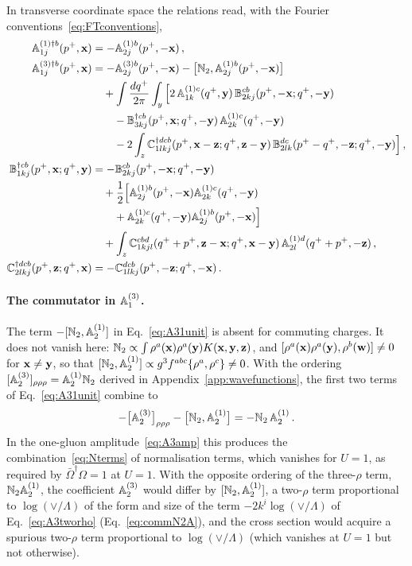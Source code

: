 In transverse coordinate space the relations read, with the Fourier conventions~\eqref{eq:FTconventions},
\begin{align}
\mathbb{A}^{(1)\dagger b}_{1j}(p^+,\mathbf{x})&=-\mathbb{A}^{(1)b}_{2j}(p^+,-\mathbf{x})\,,\notag\\
\mathbb{A}^{(3)\dagger b}_{1j}(p^+,\mathbf{x})&=-\mathbb{A}^{(3)b}_{2j}(p^+,-\mathbf{x})-\big[\mathbb{N}_2,\mathbb{A}^{(1)b}_{2j}(p^+,-\mathbf{x})\big]
\notag\\&\quad+\int\frac{dq^+}{2\pi}\int_y\Big[2\,\mathbb{A}^{(1)c}_{1k}(q^+,\mathbf{y})\,\mathbb{B}^{cb}_{2kj}(p^+,-\mathbf{x};q^+,-\mathbf{y})
\notag\\&\qquad
-\mathbb{B}^{\dagger cb}_{3kj}(p^+,\mathbf{x};q^+,-\mathbf{y})\,\mathbb{A}^{(1)c}_{2k}(q^+,-\mathbf{y})
\notag\\&\qquad-2\int_z\mathbb{C}^{\dagger dcb}_{1lkj}(p^+,\mathbf{x}-\mathbf{z};q^+,\mathbf{z}-\mathbf{y})\,\mathbb{B}^{dc}_{2lk}(p^+-q^+,-\mathbf{z};q^+,-\mathbf{y})\Big]\,,\notag\\
\mathbb{B}^{\dagger cb}_{1kj}(p^+,\mathbf{x};q^+,\mathbf{y})&=-\mathbb{B}^{cb}_{2kj}(p^+,-\mathbf{x};q^+,-\mathbf{y})\notag\\&\quad+\frac12\Big[\mathbb{A}^{(1)b}_{2j}(p^+,-\mathbf{x})\mathbb{A}^{(1)c}_{2k}(q^+,-\mathbf{y})\notag\\&\qquad+\mathbb{A}^{(1)c}_{2k}(q^+,-\mathbf{y})\mathbb{A}^{(1)b}_{2j}(p^+,-\mathbf{x})\Big]
\notag\\&\quad
+\int_z\mathbb{C}^{cbd}_{1kjl}(q^++p^+,\mathbf{z}-\mathbf{x};q^+,\mathbf{x}-\mathbf{y})\,\mathbb{A}^{(1)d}_{2l}(q^++p^+,-\mathbf{z})\,,\notag\\
\mathbb{C}^{\dagger dcb}_{2lkj}(p^+,\mathbf{z};q^+,\mathbf{x})&=-\mathbb{C}^{dcb}_{1lkj}(p^+,-\mathbf{z};q^+,-\mathbf{x})\,.
\end{align}

\paragraph{The commutator in $\mathbb{A}^{(3)}_1$.} The term $-[\mathbb{N}_2,\mathbb{A}^{(1)}_2]$ in Eq.~\eqref{eq:A31unit} is absent for commuting charges. It does not vanish here: $\mathbb{N}_2\propto\int\rho^a(\mathbf{x})\rho^a(\mathbf{y})K(\mathbf{x},\mathbf{y},\mathbf{z})$, and $[\rho^a(\mathbf{x})\rho^a(\mathbf{y}),\rho^b(\mathbf{w})]\neq0$ for $\mathbf{x}\neq\mathbf{y}$, so that $[\mathbb{N}_2,\mathbb{A}^{(1)}_2]\propto g^3f^{abc}\{\rho^a,\rho^c\}\neq0$. With the ordering $[\mathbb{A}^{(3)}_2]_{\rho\rho\rho}=\mathbb{A}^{(1)}_2\mathbb{N}_2$ derived in Appendix~\ref{app:wavefunctions}, the first two terms of Eq.~\eqref{eq:A31unit} combine to
\begin{align}
-\big[\mathbb{A}^{(3)}_2\big]_{\rho\rho\rho}-\big[\mathbb{N}_2,\mathbb{A}^{(1)}_2\big]=-\mathbb{N}_2\,\mathbb{A}^{(1)}_2\,.
\end{align}
In the one-gluon amplitude~\eqref{eq:A3amp} this produces the combination~\eqref{eq:Nterms} of normalisation terms, which vanishes for $U=1$, as required by $\bar\Omega^\dagger\Omega=1$ at $U=1$. With the opposite ordering of the three-$\rho$ term, $\mathbb{N}_2\mathbb{A}^{(1)}_2$, the coefficient $\mathbb{A}^{(3)}_2$ would differ by $[\mathbb{N}_2,\mathbb{A}^{(1)}_2]$, a two-$\rho$ term proportional to $\log(\vee/\Lambda)$ of the form and size of the term $-2k^i\log(\vee/\Lambda)$ of Eq.~\eqref{eq:A3tworho} (Eq.~\eqref{eq:commN2A}), and the cross section would acquire a spurious two-$\rho$ term proportional to $\log(\vee/\Lambda)$ (which vanishes at $U=1$ but not otherwise).
